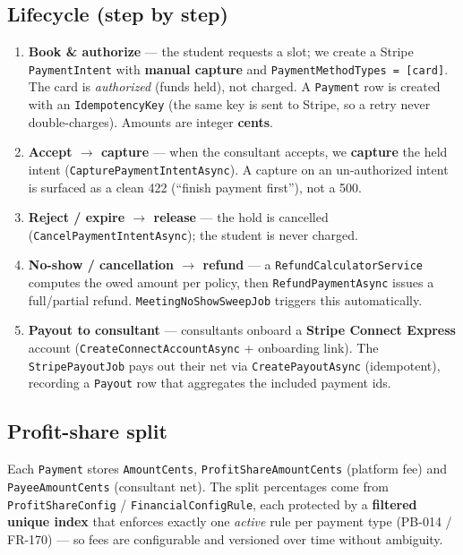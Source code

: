 \documentclass[11pt,a4paper]{article}
\newcommand{\code}[1]{\texttt{\textcolor{spInk}{#1}}}
\begin{document}
\subsection{Lifecycle (step by step)}
\begin{enumerate}
\item \textbf{Book \& authorize} --- the student requests a slot; we create a Stripe
  \code{PaymentIntent} with \textbf{manual capture} and \code{PaymentMethodTypes =
  [card]}. The card is \emph{authorized} (funds held), not charged. A \code{Payment}
  row is created with an \code{IdempotencyKey} (the same key is sent to Stripe, so a
  retry never double-charges). Amounts are integer \textbf{cents}.
\item \textbf{Accept $\rightarrow$ capture} --- when the consultant accepts, we
  \textbf{capture} the held intent (\code{CapturePaymentIntentAsync}). A capture on
  an un-authorized intent is surfaced as a clean 422 (``finish payment first''),
  not a 500.
\item \textbf{Reject / expire $\rightarrow$ release} --- the hold is cancelled
  (\code{CancelPaymentIntentAsync}); the student is never charged.
\item \textbf{No-show / cancellation $\rightarrow$ refund} --- a
  \code{RefundCalculatorService} computes the owed amount per policy, then
  \code{RefundPaymentAsync} issues a full/partial refund. \code{MeetingNoShowSweepJob}
  triggers this automatically.
\item \textbf{Payout to consultant} --- consultants onboard a \textbf{Stripe Connect
  Express} account (\code{CreateConnectAccountAsync} + onboarding link). The
  \code{StripePayoutJob} pays out their net via \code{CreatePayoutAsync} (idempotent),
  recording a \code{Payout} row that aggregates the included payment ids.
\end{enumerate}

\subsection{Profit-share split}
Each \code{Payment} stores \code{AmountCents}, \code{ProfitShareAmountCents}
(platform fee) and \code{PayeeAmountCents} (consultant net). The split percentages
come from \code{ProfitShareConfig} / \code{FinancialConfigRule}, each protected by a
\textbf{filtered unique index} that enforces exactly one \emph{active} rule per
payment type (PB-014 / FR-170) --- so fees are configurable and versioned over
time without ambiguity.
\end{document}
